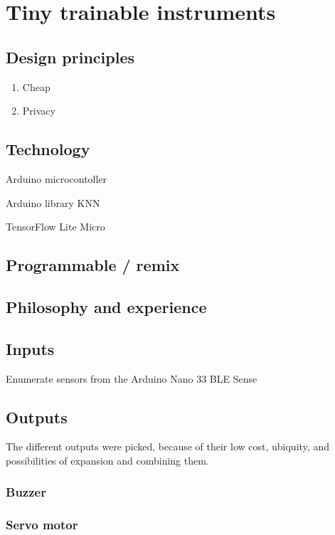 \chapter{Tiny trainable instruments}

\section{Design principles}

\begin{enumerate}
  \item Cheap
  \item Privacy
\end{enumerate}

\section{Technology}

Arduino microcontoller

Arduino library KNN

TensorFlow Lite Micro

\section{Programmable / remix}

\section{Philosophy and experience}

\section{Inputs}

Enumerate sensors from the Arduino Nano 33 BLE Sense

\section{Outputs}

The different outputs were picked, because of their low cost, ubiquity, and possibilities of expansion and combining them.

\subsection{Buzzer}

\subsection{Servo motor}

